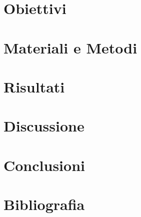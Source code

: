 \documentclass[11pt]{article}
\begin{document}
\section{Obiettivi}
\label{sec:orgb312405}

\section{Materiali e Metodi}
\label{sec:org00bdebb}

\section{Risultati}
\label{sec:org2a8922a}

\section{Discussione}
\label{sec:org24fe87b}

\section{Conclusioni}
\label{sec:org2727d64}


\section{Bibliografia}
\label{sec:org7d0beea}
\end{document}
